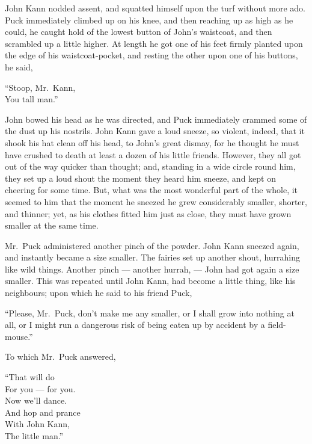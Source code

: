 \documentclass[
  12pt,
  a5paper,
  twoside]{book}
\begin{document}
John Kann nodded assent, and squatted himself upon the turf without more
ado. Puck immediately climbed up on his knee, and then reaching up as
high as he could, he caught hold of the lowest button of John's
waistcoat, and then scrambled up a little higher. At length he got one
of his feet firmly planted upon the edge of his waistcoat-pocket, and
resting the other upon one of his buttons, he said,

``Stoop, Mr.~Kann,\\
You tall man.''

John bowed his head as he was directed, and Puck immediately crammed
some of the dust up his nostrils. John Kann gave a loud sneeze, so
violent, indeed, that it shook his hat clean off his head, to John's
great dismay, for he thought he must have crushed to death at least a
dozen of his little friends. However, they all got out of the way
quicker than thought; and, standing in a wide circle round him, they set
up a loud shout the moment they heard him sneeze, and kept on cheering
for some time. But, what was the most wonderful part of the whole, it
seemed to him that the moment he sneezed he grew considerably smaller,
shorter, and thinner; yet, as his clothes fitted him just as close, they
must have grown smaller at the same time.

Mr.~Puck administered another pinch of the powder. John Kann sneezed
again, and instantly became a size smaller. The fairies set up another
shout, hurrahing like wild things. Another pinch --- another hurrah, ---
John had got again a size smaller. This was repeated until John Kann,
had become a little thing, like his neighbours; upon which he said to
his friend Puck,

``Please, Mr.~Puck, don't make me any smaller, or I shall grow into
nothing at all, or I might run a dangerous risk of being eaten up by
accident by a field-mouse.''

To which Mr.~Puck answered,

``That will do\\
For you --- for you.\\
Now we'll dance.\\
And hop and prance\\
With John Kann,\\
The little man.''
\end{document}
